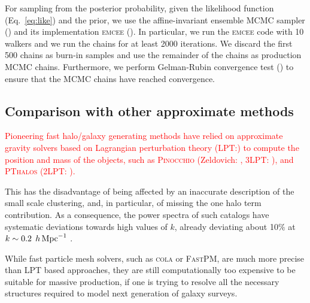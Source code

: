 \documentclass[english,usenatbib]{mn2e}
\newcommand{\tod}[1]{{\textcolor{red}{ #1}}}
\newcommand{\hperm}{\,h\,{\rm Mpc}^{-1}}
\begin{document}
For sampling from the posterior probability, given the likelihood function (Eq.~\ref{eq:like}) and the prior, we use the affine-invariant ensemble MCMC sampler (\citealt{goodmanweare}) and its implementation \textsc{emcee} (\citealt{emcee}). In particular, we run the \textsc{emcee} code with 10 walkers and we run the chains for at least 2000 iterations. We discard the first 500 chains as burn-in samples and use the remainder of the chains as production MCMC chains. Furthermore, we perform Gelman-Rubin convergence test (\citealt{grtest}) to ensure that the MCMC chains have reached convergence.

\subsection{Comparison with other approximate methods}

\tod{Pioneering fast halo/galaxy generating methods have relied on approximate gravity solvers based on Lagrangian perturbation theory (LPT:\citealt{buchert1993,bouchet1995,catelan1995,scocci2002}) to compute the position and mass of the objects, such as \textsc{Pinocchio} (Zeldovich: \citealt{monaco2002,monaco2013}, 3LPT: \citealt{monaco2016}), and \textsc{PThalos} (2LPT: \citealt{pthalo,manera2015}).}

This has the disadvantage of being affected by an inaccurate description of the small scale clustering, and, in particular, of missing the one halo term contribution. As a consequence, the power spectra of such catalogs have systematic deviations towards high values of $k$, already deviating about 10$\%$ at $k\sim0.2\; \hperm$ \citep[][]{monaco2013}.

While fast particle mesh solvers, such as \textsc{cola} or \textsc{FastPM}, are much more precise than LPT based approaches, they are  still computationally too expensive to be suitable for massive production, if one is trying to resolve all the necessary structures required to model next generation of galaxy surveys.

\end{document}
